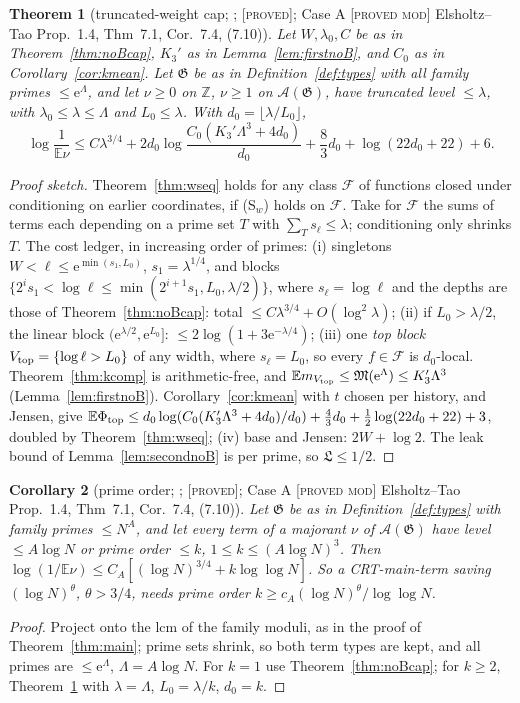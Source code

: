 \documentclass[10pt,reqno]{amsart}
\newtheorem{theorem}{Theorem}[section]
\newtheorem{corollary}[theorem]{Corollary}
\theoremstyle{definition}
\theoremstyle{remark}
\newcommand{\A}{\mathcal A}
\newcommand{\cG}{\mathfrak G}
\newcommand{\E}{\mathbb E}
\newcommand{\Z}{\mathbb Z}
\newcommand{\e}{\mathrm e}
\newcommand{\lab}[1]{\textup{[\textsc{#1}]}}
\begin{document}
\begin{theorem}[truncated-weight cap; {\cite[Thm~5.1]{KA3}}; \lab{proved}; Case A \lab{proved mod} Elsholtz--Tao Prop.~1.4, Thm~7.1, Cor.~7.4, (7.10)]\label{thm:trunc}
Let $W,\lambda_0,C$ be as in Theorem~\ref{thm:noBcap}, $K_3'$ as in
Lemma~\ref{lem:firstnoB}, and $C_0$ as in Corollary~\ref{cor:kmean}.  Let
$\cG$ be as in Definition~\ref{def:types} with all family primes $\leq\e^\Lambda$,
and let $\nu\geq0$ on $\Z$, $\nu\geq1$ on $\A(\cG)$, have truncated level $\leq\lambda$,
with $\lambda_0\leq\lambda\leq\Lambda$ and $L_0\leq\lambda$.  With $d_0=\lfloor\lambda/L_0\rfloor$,
\[
 \log\frac1{\E\nu}\leq C\lambda^{3/4}+2d_0\log\frac{C_0(K_3'\Lambda^3+4d_0)}{d_0}+\frac83d_0+\log(22d_0+22)+6.
\]
\end{theorem}
\begin{proof}[Proof sketch]
Theorem~\ref{thm:wseq} holds for any class $\mathcal F$ of functions closed
under conditioning on earlier coordinates, if (S$_w$) holds on $\mathcal F$.
Take for $\mathcal F$ the sums of terms each depending on a prime set $T$ with
$\sum_Ts_\ell\leq\lambda$; conditioning only shrinks $T$.  The cost ledger, in
increasing order of primes: (i) singletons $W<\ell\leq\e^{\min(s_1,L_0)}$,
$s_1=\lambda^{1/4}$, and blocks $\{2^is_1<\log\ell\leq\min(2^{i+1}s_1,L_0,\lambda/2)\}$, where
$s_\ell=\log\ell$ and the depths are those of Theorem~\ref{thm:noBcap}: total
$\leq C\lambda^{3/4}+O(\log^2\lambda)$; (ii) if $L_0>\lambda/2$, the linear block
$(\e^{\lambda/2},\e^{L_0}]$: $\leq2\log(1+3\e^{-\lambda/4})$; (iii) one \emph{top block}
$V_{\rm top}=\{\log\ell>L_0\}$ of any width, where $s_\ell=L_0$, so every
$f\in\mathcal F$ is $d_0$-local.  Theorem~\ref{thm:kcomp} is arithmetic-free,
and $\E m_{V_{\rm top}}\leq\mathfrak M(\e^\Lambda)\leq K_3'\Lambda^3$ (Lemma~\ref{lem:firstnoB}).
Corollary~\ref{cor:kmean} with $t$ chosen per history, and Jensen, give
$\E\Phi_{\rm top}\leq d_0\log(C_0(K_3'\Lambda^3+4d_0)/d_0)+\frac43d_0+\frac12\log(22d_0+22)+3$,
doubled by Theorem~\ref{thm:wseq}; (iv) base and Jensen: $2W+\log2$.  The
leak bound of Lemma~\ref{lem:secondnoB} is per prime, so $\mathfrak L\leq1/2$.
\end{proof}

\begin{corollary}[prime order; {\cite[Cor.~5.2]{KA3}}; \lab{proved}; Case A \lab{proved mod} Elsholtz--Tao Prop.~1.4, Thm~7.1, Cor.~7.4, (7.10)]\label{cor:primeorder}
Let $\cG$ be as in Definition~\ref{def:types} with family primes $\leq N^A$,
and let every term of a majorant $\nu$ of $\A(\cG)$ have level $\leq A\log N$ or
prime order $\leq k$, $1\leq k\leq(A\log N)^3$.  Then
$\log(1/\E\nu)\leq C_A[(\log N)^{3/4}+k\log\log N]$.  So a CRT-main-term
saving $(\log N)^\theta$, $\theta>3/4$, needs prime order $k\geq c_A(\log N)^\theta/\log\log N$.
\end{corollary}
\begin{proof}
Project onto the lcm of the family moduli, as in the proof of
Theorem~\ref{thm:main}; prime sets shrink, so both term types are kept,
and all primes are $\leq\e^\Lambda$, $\Lambda=A\log N$.  For $k=1$ use
Theorem~\ref{thm:noBcap}; for $k\geq2$, Theorem~\ref{thm:trunc} with $\lambda=\Lambda$,
$L_0=\lambda/k$, $d_0=k$.
\end{proof}
\end{document}
